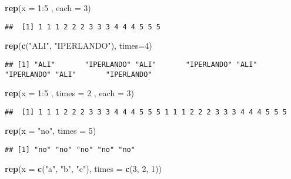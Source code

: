 \documentclass[]{book}
\newenvironment{Shaded}{\begin{snugshade}}{\end{snugshade}}
\newcommand{\KeywordTok}[1]{\textcolor[rgb]{0.13,0.29,0.53}{\textbf{{#1}}}}
\newcommand{\DataTypeTok}[1]{\textcolor[rgb]{0.13,0.29,0.53}{{#1}}}
\newcommand{\DecValTok}[1]{\textcolor[rgb]{0.00,0.00,0.81}{{#1}}}
\newcommand{\StringTok}[1]{\textcolor[rgb]{0.31,0.60,0.02}{{#1}}}
\newcommand{\NormalTok}[1]{{#1}}
\begin{document}
\begin{Shaded}
\begin{Highlighting}[]
\KeywordTok{rep}\NormalTok{(}\DataTypeTok{x =} \DecValTok{1}\NormalTok{:}\DecValTok{5} \NormalTok{, }\DataTypeTok{each =} \DecValTok{3}\NormalTok{)}
\end{Highlighting}
\end{Shaded}

\begin{verbatim}
##  [1] 1 1 1 2 2 2 3 3 3 4 4 4 5 5 5
\end{verbatim}

\begin{Shaded}
\begin{Highlighting}[]
\KeywordTok{rep}\NormalTok{(}\KeywordTok{c}\NormalTok{(}\StringTok{"ALI"}\NormalTok{, }\StringTok{"IPERLANDO"}\NormalTok{), }\DataTypeTok{times=}\DecValTok{4}\NormalTok{)}
\end{Highlighting}
\end{Shaded}

\begin{verbatim}
## [1] "ALI"       "IPERLANDO" "ALI"       "IPERLANDO" "ALI"       "IPERLANDO" "ALI"       "IPERLANDO"
\end{verbatim}

\begin{Shaded}
\begin{Highlighting}[]
\KeywordTok{rep}\NormalTok{(}\DataTypeTok{x =} \DecValTok{1}\NormalTok{:}\DecValTok{5} \NormalTok{, }\DataTypeTok{times =} \DecValTok{2} \NormalTok{, }\DataTypeTok{each =} \DecValTok{3}\NormalTok{)}
\end{Highlighting}
\end{Shaded}

\begin{verbatim}
##  [1] 1 1 1 2 2 2 3 3 3 4 4 4 5 5 5 1 1 1 2 2 2 3 3 3 4 4 4 5 5 5
\end{verbatim}

\begin{Shaded}
\begin{Highlighting}[]
\KeywordTok{rep}\NormalTok{(}\DataTypeTok{x =} \StringTok{"no"}\NormalTok{,  }\DataTypeTok{times =} \DecValTok{5}\NormalTok{)}
\end{Highlighting}
\end{Shaded}

\begin{verbatim}
## [1] "no" "no" "no" "no" "no"
\end{verbatim}

\begin{Shaded}
\begin{Highlighting}[]
\KeywordTok{rep}\NormalTok{(}\DataTypeTok{x =} \KeywordTok{c}\NormalTok{(}\StringTok{"a"}\NormalTok{, }\StringTok{"b"}\NormalTok{, }\StringTok{"c"}\NormalTok{), }\DataTypeTok{times =} \KeywordTok{c}\NormalTok{(}\DecValTok{3}\NormalTok{, }\DecValTok{2}\NormalTok{, }\DecValTok{1}\NormalTok{))}
\end{Highlighting}
\end{Shaded}
\end{document}
